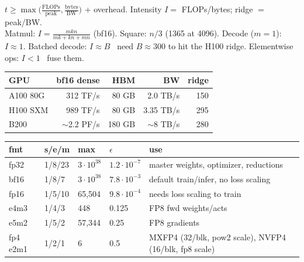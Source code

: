 \begin{mem}[Roofline]
$t\ge\max\big(\tfrac{\text{FLOPs}}{\text{peak}},\tfrac{\text{bytes}}{\text{BW}}\big)$ + overhead. Intensity $I=$ FLOPs/bytes; ridge $=$ peak/BW.\\
Matmul: $I=\frac{mkn}{mk+kn+mn}$ (bf16). Square: $n/3$ (1365 at 4096). Decode ($m{=}1$): $I\approx1$. Batched decode: $I\approx B$ \ra\ need $B\approx300$ to hit the H100 ridge. Elementwise ops: $I<1$ \ra\ fuse them.\\[2pt]
\begin{tabularx}{\linewidth}{@{}lrrrr@{}}
\toprule
GPU & bf16 dense & HBM & BW & ridge\\\midrule
A100 80G & 312 TF/s & 80 GB & 2.0 TB/s & 150\\
H100 SXM & 989 TF/s & 80 GB & 3.35 TB/s & 295\\
B200 & $\sim$2.2 PF/s & 180 GB & $\sim$8 TB/s & 280\\\bottomrule
\end{tabularx}
\end{mem}

\begin{mem}[Number formats: exponent = range, mantissa = precision]
\begin{tabularx}{\linewidth}{@{}llllL@{}}
\toprule
fmt & s/e/m & max & $\epsilon$ & use\\\midrule
fp32 & 1/8/23 & $3\!\cdot\!10^{38}$ & $1.2\!\cdot\!10^{-7}$ & master weights, optimizer, reductions\\
bf16 & 1/8/7 & $3\!\cdot\!10^{38}$ & $7.8\!\cdot\!10^{-3}$ & default train/infer, no loss scaling\\
fp16 & 1/5/10 & 65{,}504 & $9.8\!\cdot\!10^{-4}$ & needs loss scaling to train\\
e4m3 & 1/4/3 & 448 & 0.125 & FP8 fwd weights/acts\\
e5m2 & 1/5/2 & 57{,}344 & 0.25 & FP8 gradients\\
fp4 e2m1 & 1/2/1 & 6 & 0.5 & MXFP4 (32/blk, pow2 scale), NVFP4 (16/blk, fp8 scale)\\\bottomrule
\end{tabularx}
\end{mem}

